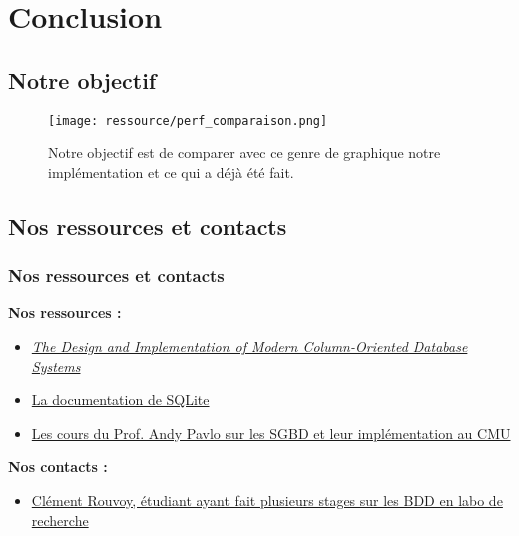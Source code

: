 \documentclass[a4paper,12pt]{beamer}
\begin{document}
\section{Conclusion}
\subsection{Notre objectif}

\begin{frame}
	\begin{figure}[h]
		\centering
		\texttt{[image: ressource/perf\_comparaison.png]}
		\caption{Notre objectif est de comparer avec ce genre de graphique notre implémentation et ce qui a déjà été fait.}
	\end{figure}
\end{frame}

\subsection{Nos ressources et contacts}
\begin{frame}
	\frametitle{Nos ressources et contacts}

	\textbf{Nos ressources :}
	\begin{itemize}
		\item \href{https://drive.google.com/file/d/1KNmuRBf8CV-s-zqdkUEP8iyYlPgFiglb/view?usp=drive_link}{\textit{The Design and Implementation of Modern Column-Oriented Database Systems}}
		\item \href{https://www.sqlite.org/docs.html}{La documentation de SQLite}
		\item \href{https://www.youtube.com/watch?v=LWS8LEQAUVc&list=PLSE8ODhjZXjYzlLMbX3cR0sxWnRM7CLFn}{Les cours du Prof. Andy Pavlo sur les SGBD et leur implémentation au CMU}
	\end{itemize}

	\medskip

	\textbf{Nos contacts :}
	\begin{itemize}
		\item \href{https://www.normalesup.org/~rouvroy}{Clément Rouvoy, étudiant ayant fait plusieurs stages sur les BDD en labo de recherche}
	\end{itemize}
\end{frame}
\end{document}
